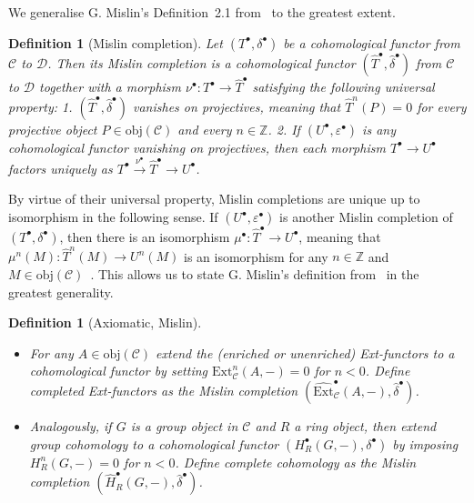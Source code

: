 \documentclass[12pt, a4paper]{article}
\numberwithin{equation}{section}
\newtheorem{defn}[thm]{Definition}
\theoremstyle{empty}
\theoremstyle{nonumberplain}
\begin{document}
We generalise G.\! Mislin's Definition~2.1 from~\cite{mis94} to the greatest extent.

\begin{defn}[Mislin completion]\label{defn:mislincompletion}
Let $(T^{\bullet}, \delta^{\bullet})$ be a cohomological functor from $\mathcal{C}$ to $\mathcal{D}$. Then its Mislin completion is a cohomological functor $(\widehat{T}^{\bullet}, \widehat{\delta}^{\bullet})$ from $\mathcal{C}$ to $\mathcal{D}$ together with a morphism $\nu^{\bullet}: T^{\bullet} \rightarrow \widehat{T}^{\bullet}$ satisfying the following universal property: \newline
\textnormal{1.} $(\widehat{T}^{\bullet}, \widehat{\delta}^{\bullet})$ vanishes on projectives, meaning that $\widehat{T}^n(P) = 0$ for every projective object $P \in \mathrm{obj}(\mathcal{C})$ and every $n \in \mathbb{Z}$. \newline
\textnormal{2.} If $(U^{\bullet}, \varepsilon^{\bullet})$ is any cohomological functor vanishing on projectives, then each morphism $T^{\bullet} \rightarrow U^{\bullet}$ factors uniquely as $T^{\bullet} \xrightarrow{\nu^{\bullet}} \widehat{T}^{\bullet} \rightarrow U^{\bullet}$.
\end{defn}

By virtue of their universal property, Mislin completions are unique up to isomorphism in the following sense. If $(U^{\bullet}, \varepsilon^{\bullet})$ is another Mislin completion of $(T^{\bullet}, \delta^{\bullet})$, then there is an isomorphism $\mu^{\bullet}: \widehat{T}^{\bullet} \rightarrow U^{\bullet}$, meaning that $\mu^n(M): \widehat{T}^n(M) \rightarrow U^n(M)$ is an isomorphism for any $n \in \mathbb{Z}$ and $M \in \mathrm{obj}(\mathcal{C})$~\cite[p.~202]{kro95}. This allows us to state G.\! Mislin's definition from~\cite[p.~297]{mis94} in the greatest generality.

\begin{defn}[Axiomatic, Mislin]\label{defn:axiomatic}
${} \quad {}$
\begin{itemize}
\item For any $A \in \mathrm{obj}(\mathcal{C})$ extend the (enriched or unenriched) Ext-functors to a cohomological functor by setting $\mathrm{Ext}_{\mathcal{C}}^n(A, -) = 0$ for $n < 0$. Define completed Ext-functors as the Mislin completion $(\widehat{\mathrm{Ext}}_{\mathcal{C}}^{\bullet}(A, -), \widehat{\delta}^{\bullet})$.
\item Analogously, if $G$ is a group object in $\mathcal{C}$ and $R$ a ring object, then extend group cohomology to a cohomological functor $(H_R^{\bullet}(G, -), \delta^{\bullet})$ by imposing $H_R^n(G, -) = 0$ for $n < 0$. Define complete cohomology as the Mislin completion $(\widehat{H}_R^{\bullet}(G, -), \widehat{\delta}^{\bullet})$.
\end{itemize}
\end{defn}
\end{document}
